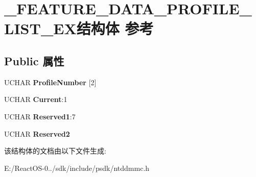 \hypertarget{struct___f_e_a_t_u_r_e___d_a_t_a___p_r_o_f_i_l_e___l_i_s_t___e_x}{}\section{\+\_\+\+F\+E\+A\+T\+U\+R\+E\+\_\+\+D\+A\+T\+A\+\_\+\+P\+R\+O\+F\+I\+L\+E\+\_\+\+L\+I\+S\+T\+\_\+\+E\+X结构体 参考}
\label{struct___f_e_a_t_u_r_e___d_a_t_a___p_r_o_f_i_l_e___l_i_s_t___e_x}
\subsection*{Public 属性}
\begin{DoxyCompactItemize}
\item 
\mbox{\label{struct___f_e_a_t_u_r_e___d_a_t_a___p_r_o_f_i_l_e___l_i_s_t___e_x_aacce1e1e3dd7a72dff9fa45ced7bd157}} 
U\+C\+H\+AR {\bfseries Profile\+Number} \mbox{[}2\mbox{]}
\item 
\mbox{\label{struct___f_e_a_t_u_r_e___d_a_t_a___p_r_o_f_i_l_e___l_i_s_t___e_x_a95b89ad6124d1add6e29db5c79a14a6e}} 
U\+C\+H\+AR {\bfseries Current}\+:1
\item 
\mbox{\label{struct___f_e_a_t_u_r_e___d_a_t_a___p_r_o_f_i_l_e___l_i_s_t___e_x_a225fa01bd10da80311a5252d1308b8a8}} 
U\+C\+H\+AR {\bfseries Reserved1}\+:7
\item 
\mbox{\label{struct___f_e_a_t_u_r_e___d_a_t_a___p_r_o_f_i_l_e___l_i_s_t___e_x_abe2d55c577ddeb157ba68a8ff234f064}} 
U\+C\+H\+AR {\bfseries Reserved2}
\end{DoxyCompactItemize}


该结构体的文档由以下文件生成\+:\begin{DoxyCompactItemize}
\item 
E\+:/\+React\+O\+S-\/0../sdk/include/psdk/ntddmmc.\+h\end{DoxyCompactItemize}
